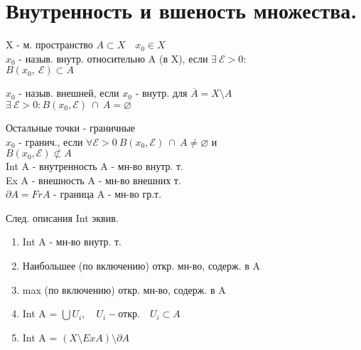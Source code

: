 \documentclass[geometry.tex]{subfiles}
\begin{document}
  \section{Внутренность и вшеность множества.}

  \begin{definition}
      X - м. пространство $A \subset X \quad x_0 \in X$\\
      $x_0$ - назыв. внутр. относительно A (в X), если $\exists \  \mathcal{E} > 0:$\\
      $B(x_0, \  \mathcal{E}) \subset A$
  \end{definition}

  \begin{definition}
      $x_0$ - назыв. внешней, если $x_0$ - внутр. для $\overline{A} = X \setminus A$\\
      $\exists \  \mathcal{E} > 0 : B(x_0, \mathcal{E}) \  \cap \  A = \varnothing$
  \end{definition}

  \begin{definition}
      Остальные точки - граничные\\
      $x_0$ - гранич., если $\forall \mathcal{E} > 0 \  B(x_0, \mathcal{E}) \  \cap \  A \neq \varnothing$ и\\
      $B(x_0, \mathcal{E}) \not\subset A$\\
      Int A - внутренность A - мн-во внутр. т.\\
      Ex A - внешность A - мн-во внешних т.\\
      $\partial A = Fr A$ - граница A - мн-во гр.т.
  \end{definition}

  \begin{theorem}
      След. описания Int эквив.\\
      \begin{enumerate}
          \item Int A - мн-во внутр. т.
          \item Наибольшее (по включению) откр. мн-во, содерж. в A
          \item max (по включению) откр. мн-во, содерж. в A
          \item Int A = $\bigcup U_i, \quad U_i - \text{откр.} \quad U_i \subset A$
          \item Int A = $(X \setminus Ex A) \setminus \partial A$
      \end{enumerate}
  \end{theorem}
\end{document}
